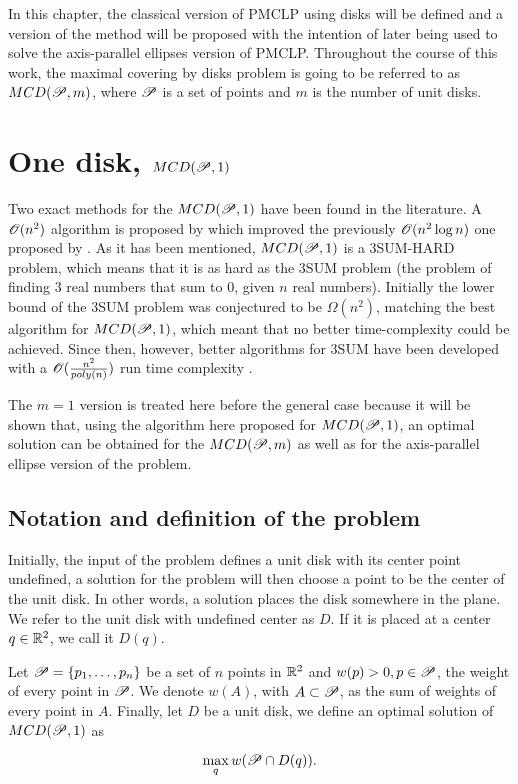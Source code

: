In this chapter, the classical version of PMCLP using disks will be defined and a version of the method will be proposed with the intention of later being used to solve the axis-parallel ellipses version of PMCLP. Throughout the course of this work, the maximal covering by disks problem is going to be referred to as $MCD(\mathscr{P},m)$, where $\mathscr{P}$ is a set of points and $m$ is the number of unit disks.

\section{One disk, $MCD(\mathscr{P},1)$}


Two exact methods for the $MCD(\mathscr{P}, 1)$ have been found in the literature. A $\mathscr{O}(n^2)$ algorithm is proposed by \cite{chazelle:1986} which improved the previously $\mathscr{O}(n^2\log{n})$ one proposed by \cite{drezner}.
As it has been mentioned, $MCD(\mathscr{P},1)$ is a 3SUM-HARD problem, which means that it is as hard as the 3SUM problem (the problem of finding $3$ real numbers that sum to $0$, given $n$ real numbers). Initially the lower bound of the 3SUM problem was conjectured to be $\Omega(n^2)$, matching the best algorithm for $MCD(\mathscr{P},1)$, which meant that no better time-complexity could be achieved. Since then, however, better algorithms for 3SUM have been developed with a $\mathscr{O}(\frac{n^2}{poly(n)})$ run time complexity \cite{3SUM-kopelowitz:2014}.

The $m=1$ version is treated here before the general case because it will be shown that, using the algorithm here proposed for $MCD(\mathscr{P}, 1)$, an optimal solution can be obtained for the $MCD(\mathscr{P}, m)$ as well as for the axis-parallel ellipse version of the problem.

\subsection{Notation and definition of the problem}

Initially, the input of the problem defines a unit disk with its center point undefined, a solution for the problem will then choose a point to be the center of the unit disk. In other words, a solution places the disk somewhere in the plane.
We refer to the unit disk with undefined center as $D$. If it is placed at a center $q \in \mathbb{R}^2$, we call it $D(q)$.

\begin{definicao}
    Let $\mathscr{P}=\{p_1,\dots,p_n\}$ be a set of $n$ points in $\mathbb{R}^2$ and $w(p)>0, p \in \mathscr{P}$, the weight of every point in $\mathscr{P}$. We denote $w(A)$, with $A \subset \mathscr{P}$, as the sum of weights of every point in $A$. Finally, let $D$ be a unit disk, we define an optimal solution of $MCD(\mathscr{P},1)$ as
    
    \begin{equation}\label{eq:max_one_disk}
        \max_q w(\mathscr{P} \cap D(q)).
    \end{equation}

\end{definicao}

